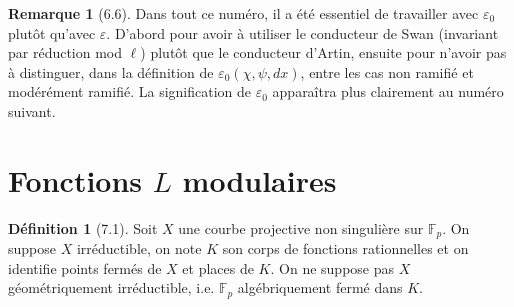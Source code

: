 \documentclass[11pt]{amsart}
\theoremstyle{plain}
\theoremstyle{definition}
\newtheorem{definition}[theorem]{D\'efinition}
\newtheorem{remark}[theorem]{Remarque}
\begin{document}
\begin{remark}[6.6]
Dans tout ce num\'ero, il a \'et\'e essentiel de travailler avec $\varepsilon_0$ plut\^ot qu'avec $\varepsilon$. D'abord pour avoir \`a utiliser le conducteur de Swan (invariant par r\'eduction mod $\ell$) plut\^ot que le conducteur d'Artin, ensuite pour n'avoir pas \`a distinguer, dans la d\'efinition de $\varepsilon_0(\chi,\psi,dx)$, entre les cas non ramifi\'e et mod\'er\'ement ramifi\'e. La signification de $\varepsilon_0$ appara\^itra plus clairement au num\'ero suivant.
\end{remark}

\section{Fonctions $L$ modulaires}

\begin{definition}[7.1]
Soit $X$ une courbe projective non singuli\`ere sur $\mathbb{F}_p$. On suppose $X$ irr\'eductible, on note $K$ son corps de fonctions rationnelles et on identifie points ferm\'es de $X$ et places de $K$. On ne suppose pas $X$ g\'eom\'etriquement irr\'eductible, i.e. $\mathbb{F}_p$ alg\'ebriquement ferm\'e dans $K$.
\end{definition}
\end{document}
